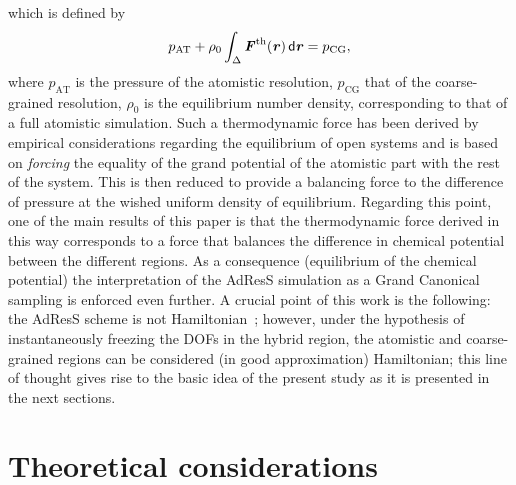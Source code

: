 \documentclass[aip,jcp,a4paper,reprint,onecolumn]{revtex4-1}
\newcommand{\vect}[1]{\textbf{\textit{#1}}}
\newcommand{\dd}[1]{\textsf{#1}}
\newcommand{\AT}{{\textrm{{AT}}}}
\newcommand{\CG}{{\textrm{CG}}}
\begin{document}
which is defined by
\begin{equation}
  p_{\AT}+
  \rho_0
  \int_{\Delta} {\vect F}^\text{th}(\vect r)\,\dd d\vect r
  =p_{\CG},
  \label{thf}
\end{equation}
where $p_{\AT}$ is the pressure of the atomistic resolution, $p_{\CG}$ that of the coarse-grained resolution, $\rho_{0}$ is the equilibrium number density, corresponding to that of a full atomistic simulation.
Such a thermodynamic force has been derived by empirical considerations regarding the equilibrium of open systems and is based on {\it forcing} the equality of the grand potential of the atomistic part with the rest of the system.
This is then reduced to provide a balancing force to the difference of pressure at the wished uniform density of equilibrium. Regarding this point, one of the main results of this paper is that the thermodynamic force derived in this way corresponds to a force that balances the difference in chemical potential between the different regions. As a consequence (equilibrium of the chemical potential) the interpretation of the AdResS simulation as a Grand Canonical sampling is enforced even further.
 A crucial point of this work is the following: the 
AdResS scheme is not Hamiltonian~\cite{presolo,prlcomm}; however, under the hypothesis of instantaneously
freezing the DOFs in the hybrid region, the atomistic and
coarse-grained regions can be considered (in good approximation) Hamiltonian; this line of thought gives rise to the basic
idea of the present study as it is presented in the next sections.

\section{Theoretical considerations}
\end{document}
